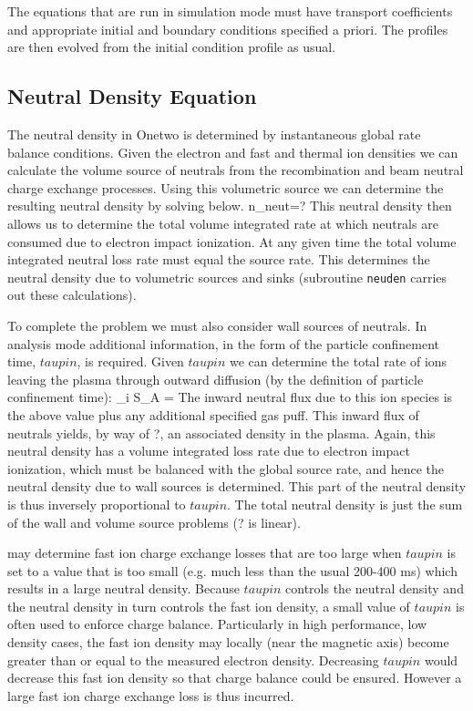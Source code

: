 The equations that are run in simulation mode must have  transport coefficients
and appropriate initial and boundary conditions specified a priori. The profiles
are then evolved from the initial condition profile as usual. 

\subsection{Neutral Density Equation}

The neutral density in Onetwo is determined by instantaneous global rate balance
conditions. Given the electron and fast and thermal ion densities we can
calculate the volume source of neutrals from the recombination and beam neutral
charge exchange processes. Using this volumetric source we can determine the
resulting neutral density by solving  below.
\beq 
 n_{neut}=?\label{eq:neut}
\eeq 
This neutral density then allows us to determine the total volume integrated
rate at which neutrals are consumed due to electron impact ionization.  At any
given time the total volume integrated neutral loss rate must equal the  source
rate.  This  determines the neutral density due to volumetric sources and sinks
(subroutine \texttt{neuden} carries out these calculations).

To complete the problem we must also consider wall sources of neutrals. In
analysis mode additional information, in the form of the particle confinement
time, $taupin $, is required. Given $taupin $ we can determine the total rate 
of ions leaving the plasma through outward diffusion (by the definition of
particle confinement time):
\beq
 \Gamma_i S_A = 
\eeq
The inward neutral flux due to this ion species is the above value plus any
additional specified gas puff. This inward flux of neutrals yields, by way of
?, an associated density in the plasma. Again, this neutral
density has a volume integrated loss rate due to electron impact ionization, 
which must be balanced with the global source  rate,  and  hence the neutral
density due to wall sources is determined. This part of the neutral density is
thus inversely proportional to $taupin$. The total neutral density is just the
sum of the wall and volume  source problems (? is linear). 

\ot  may determine  fast ion charge exchange losses that are too large when
$taupin $ is set to a  value that is too small (e.g. much less than the usual
200-400 ms) which results in a large neutral density. Because $taupin $ controls
the neutral density and the neutral density in turn controls the fast ion
density, a small value of $taupin $ is often used to enforce charge balance.
Particularly in high performance, low density cases, the fast ion density  may
locally (near the magnetic axis) become greater than or equal to the measured
electron density. Decreasing $taupin$ would decrease this fast ion density so
that charge balance could be ensured. However a large fast ion charge exchange
loss is thus incurred.

